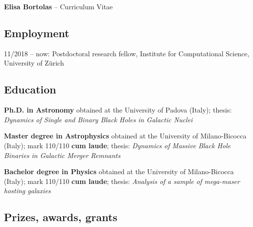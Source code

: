 \documentclass[11pt,a4paper]{article}
\begin{document}
\thispagestyle{empty}
\begin{center}
\begin{Large}
{\color{color} {\bf Elisa Bortolas} }-- {Curriculum Vitae}
\end{Large}

\vspace{-6pt}

\end{center}


\subsection*{Employment}

11/2018 – now: Postdoctoral research fellow, Institute for Computational Science,  University of Z\"urich 

\subsection*{Education}
\begin{description}
\setlength\itemsep{-1.5pt}
\item[\normalfont 05/03/2019:]  \textbf{Ph.D. in Astronomy} obtained at the University of Padova (Italy);
thesis: \textit{Dynamics of Single and Binary Black Holes in Galactic Nuclei}


\item[\normalfont 21/09/2015:] \textbf{Master degree in Astrophysics} obtained  at the University of Milano-Bicocca (Italy); mark 110/110 \textbf{cum laude}; thesis: \textit{Dynamics of Massive Black Hole Binaries in Galactic Merger Remnants}


\item[\normalfont 21/10/2013:]  \textbf{Bachelor degree in Physics} obtained at the University of Milano-Bicocca (Italy); mark 110/110 \textbf{cum laude}; 
thesis: \textit{Analysis of a sample of mega-maser hosting galaxies}
\end{description}

\subsection*{{Prizes, awards, grants}}
\end{document}
